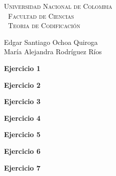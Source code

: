 \documentclass[12pt, a4paper]{article}%
\begin{document}
\setlength{\parindent}{0cm}
\hoffset-0.46cm
\voffset-1.46cm

\begin{window}
\large\scshape  \hspace{0.4cm}\textsf{Universidad Nacional de Colombia} \\
\textcolor{white}{\tiny.}  \large \hspace{1.5cm} \textsf{Facultad de Ciencias} \\
\textcolor{white}{\tiny.}   \normalsize\hspace{0.7cm}\textsf{Teoria de Codificación}\\
 

\end{window}

\vspace{0.2cm}
\small
\textsf{Edgar Santiago Ochoa Quiroga\\
María Alejandra  Rodríguez  Ríos} 
\normalsize
\dotfill
\vspace{0.7cm}

 \textbf{Ejercicio 1}
  

  \textbf{Ejercicio 2}
 
 
 

 \textbf{Ejercicio 3}
 
 
  \textbf{Ejercicio 4}
 

  \textbf{Ejercicio 5}
 

  \textbf{Ejercicio 6}
 
 
  \textbf{Ejercicio 7}
 





 
\end{document}
